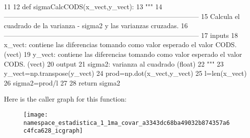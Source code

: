 \begin{DoxyCode}
11 
12 def sigmaCalcCODS(x_vect,y_vect):
13     """
14    
       --------------------------------------------------------------------------------------
15     Calcula el cuadrado de la varianza - sigma2 y las varianzas cruzadas.
16    
       --------------------------------------------------------------------------------------
17     inputs
18         x_vect: contiene las diferencias tomando como valor esperado el valor
       CODS. (vect)
19         y_vect: contiene las diferencias tomando como valor esperado el valor
       CODS. (vect)
20     output
21         sigma2: varianza al cuadrado (float)
22     """
23     y_vect=np.transpose(y_vect)
24     prod=np.dot(x_vect,y_vect)
25     l=len(x_vect)
26     sigma2=prod/l
27     
28     return sigma2

\end{DoxyCode}


\-Here is the caller graph for this function\-:\nopagebreak
\begin{figure}[H]
\begin{center}
\leavevmode
\texttt{[image: namespace\_estadistica\_1\_1ma\_covar\_a3343dc68ba49032b874357a6c4fca628\_icgraph]}
\end{center}
\end{figure}


